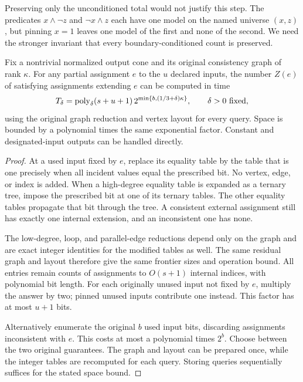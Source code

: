 Preserving only the unconditioned total would not justify this step.
The predicates $x\land\neg z$ and $\neg x\land z$ each have one
model on the named universe $(x,z)$, but pinning $x=1$ leaves one
model of the first and none of the second. We need the stronger
invariant that every boundary-conditioned count is preserved.

\begin{lemma}
\label{lem:pinning-layout}
Fix a nontrivial normalized output cone and its original consistency
graph of rank $\kappa$. For any partial assignment $e$ to the $u$
declared inputs, the number $Z(e)$ of satisfying assignments extending
$e$ can be computed in time
\begin{equation}\label{eq:pinned-counting}
 T_\delta=\operatorname{poly}_\delta(s+u+1)\,
 2^{\min\{b,(1/3+\delta)\kappa\}},
 \qquad \delta>0\text{ fixed},
\end{equation}
using the original graph reduction and vertex layout for every query.
Space is bounded by a polynomial times the same exponential factor.
Constant and designated-input outputs can be handled directly.
\end{lemma}
\begin{proof}
At a used input fixed by $e$, replace its equality table by the table
that is one precisely when all incident values equal the prescribed
bit. No vertex, edge, or index is added. When a high-degree equality
table is expanded as a ternary tree, impose the prescribed bit at one
of its ternary tables. The other equality tables propagate that bit
through the tree. A consistent external assignment still has exactly
one internal extension, and an inconsistent one has none.

The low-degree, loop, and parallel-edge reductions depend only on the
graph and are exact integer identities for the modified tables as
well. The same residual graph and layout therefore give the same
frontier sizes and operation bound. All entries remain counts of
assignments to $O(s+1)$ internal indices, with polynomial bit length.
For each originally unused input not fixed by $e$, multiply the
answer by two; pinned unused inputs contribute one instead. This
factor has at most $u+1$ bits.

Alternatively enumerate the original $b$ used input bits, discarding
assignments inconsistent with $e$. This costs at most a polynomial
times $2^b$. Choose between the two original guarantees. The graph
and layout can be prepared once, while the integer tables are
recomputed for each query. Storing queries sequentially suffices for
the stated space bound.
\end{proof}


